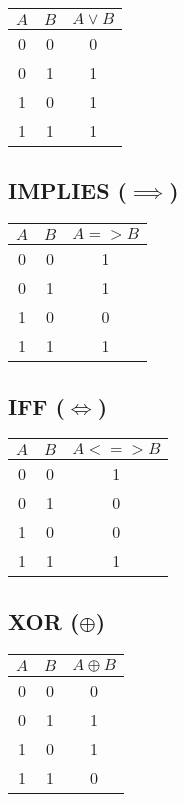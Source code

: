 \begin{multicols}{2}
	\begin{tabular}{ccc}
		\toprule
		$A$ & $B$ & $A \lor B$ \\
		\midrule
		0   & 0   & 0          \\
		0   & 1   & 1          \\
		1   & 0   & 1          \\
		1   & 1   & 1          \\
		\bottomrule
	\end{tabular}

	\vspace{1em}

	\subsection*{IMPLIES ($\implies$)}

	\begin{tabular}{ccc}
		\toprule
		$A$ & $B$ & $A => B$ \\
		\midrule
		0   & 0   & 1        \\
		0   & 1   & 1        \\
		1   & 0   & 0        \\
		1   & 1   & 1        \\
		\bottomrule
	\end{tabular}

	\columnbreak
	\subsection*{IFF ($\iff$)}

	\begin{tabular}{ccc}
		\toprule
		$A$ & $B$ & $A <=> B$ \\
		\midrule
		0   & 0   & 1         \\
		0   & 1   & 0         \\
		1   & 0   & 0         \\
		1   & 1   & 1         \\
		\bottomrule
	\end{tabular}

	\vspace{1em}

	\subsection*{XOR ($\oplus$)}

	\begin{tabular}{ccc}
		\toprule
		$A$ & $B$ & $A \oplus B$ \\
		\midrule
		0   & 0   & 0            \\
		0   & 1   & 1            \\
		1   & 0   & 1            \\
		1   & 1   & 0            \\
		\bottomrule
	\end{tabular}


\end{multicols}
